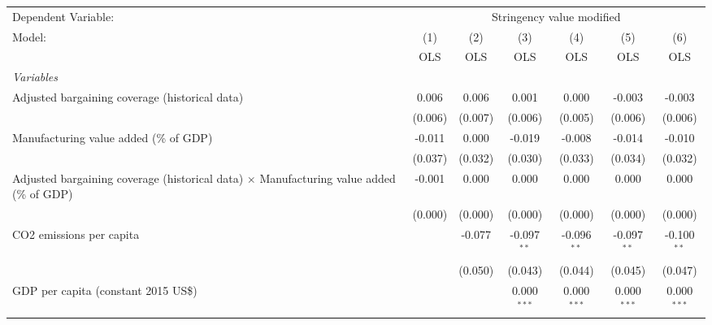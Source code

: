 
\begingroup
\centering
\begin{tabular}{lcccccc}
   \toprule
   Dependent Variable: & \multicolumn{6}{c}{Stringency value modified}\\
   Model:                                                                                          & (1)     & (2)     & (3)           & (4)           & (5)           & (6)\\  
                                                                                                   &  OLS    & OLS     & OLS           & OLS           & OLS           & OLS\\  
   \midrule
   \emph{Variables}\\
   Adjusted bargaining coverage (historical data)                                                  & 0.006   & 0.006   & 0.001         & 0.000         & -0.003        & -0.003\\   
                                                                                                   & (0.006) & (0.007) & (0.006)       & (0.005)       & (0.006)       & (0.006)\\   
   Manufacturing value added (\% of GDP)                                                           & -0.011  & 0.000   & -0.019        & -0.008        & -0.014        & -0.010\\   
                                                                                                   & (0.037) & (0.032) & (0.030)       & (0.033)       & (0.034)       & (0.032)\\   
   Adjusted bargaining coverage (historical data) $\times$ Manufacturing value added (\% of GDP)   & -0.001  & 0.000   & 0.000         & 0.000         & 0.000         & 0.000\\   
                                                                                                   & (0.000) & (0.000) & (0.000)       & (0.000)       & (0.000)       & (0.000)\\   
   CO2 emissions per capita                                                                        &         & -0.077  & -0.097$^{**}$ & -0.096$^{**}$ & -0.097$^{**}$ & -0.100$^{**}$\\   
                                                                                                   &         & (0.050) & (0.043)       & (0.044)       & (0.045)       & (0.047)\\   
   GDP per capita (constant 2015 US\$)                                                             &         &         & 0.000$^{***}$ & 0.000$^{***}$ & 0.000$^{***}$ & 0.000$^{***}$\\   

\end{tabular}
